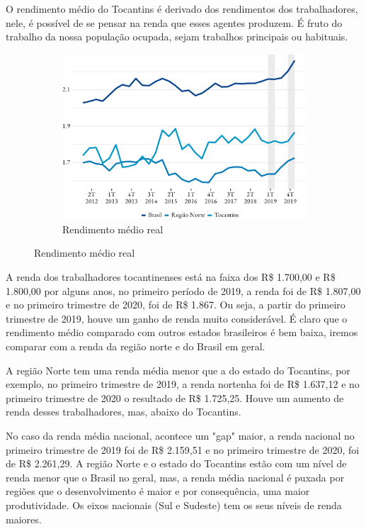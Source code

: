 \par O rendimento médio do Tocantins é derivado dos rendimentos dos trabalhadores, nele, é possível de se pensar na renda que esses agentes produzem. É fruto do trabalho da nossa população ocupada, sejam trabalhos principais ou habituais.

\begin{figure}[!h]
	\begin{subfigure}{\linewidth}
		\caption{Rendimento médio real}
		\includegraphics{fig/rend_medio-1.pdf}
	\end{subfigure}
\end{figure}


\par A renda dos trabalhadores tocantinenses está na faixa dos R\$ 1.700,00 e R\$ 1.800,00 por alguns anos, no primeiro período de 2019, a renda foi de R\$ 1.807,00 e no primeiro trimestre de 2020, foi de R\$ 1.867. Ou seja, a partir do primeiro trimestre de 2019, houve um ganho de renda muito considerável. É claro que o rendimento médio comparado com outros estados brasileiros é bem baixa, iremos comparar com a renda da região norte e do Brasil em geral.


\par A região Norte tem uma renda média menor que a do estado do Tocantins, por exemplo, no primeiro trimestre de 2019, a renda nortenha foi de R\$ 1.637,12 e no primeiro trimestre de 2020 o resultado de R\$ 1.725,25. Houve um aumento de renda desses trabalhadores, mas, abaixo do Tocantins.



\par No caso da renda média nacional, acontece um "gap" maior, a renda nacional no primeiro trimestre de 2019 foi de R\$ 2.159,51 e no primeiro trimestre de 2020, foi de R\$ 2.261,29. A região Norte e o estado do Tocantins estão com um nível de renda menor que o Brasil no geral, mas, a renda média nacional é puxada por regiões que o desenvolvimento é maior e por consequência, uma maior produtividade. Os eixos nacionais (Sul e Sudeste) tem os seus níveis de renda maiores.
